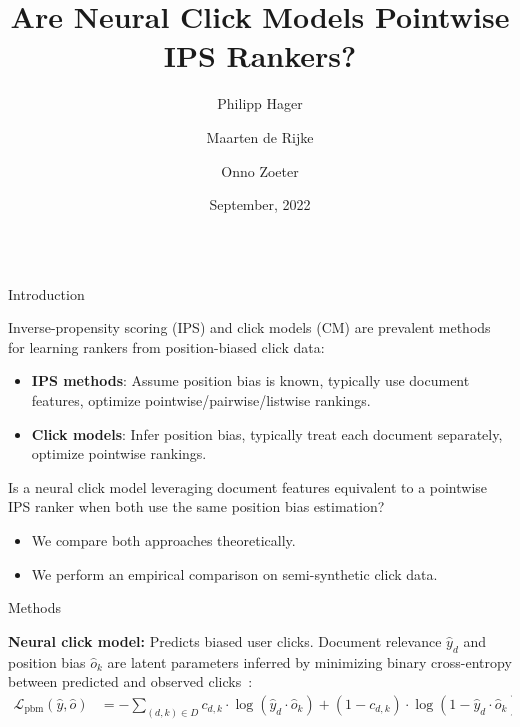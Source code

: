 \documentclass[final]{beamer}
\title{\huge Are Neural Click Models Pointwise IPS Rankers?}
\author{Philipp Hager\inst{1} \and Maarten de Rijke\inst{1} \and Onno Zoeter\inst{2}}
\institute[shortinst]{\inst{1} University of Amsterdam \inst{2} Booking.com}
\date[Sep. 2022]{September, 2022}
\newlength{\onecolwid}
\begin{document}
\begin{frame}[t]
	\begin{columns}[t]
    \begin{column}{\onecolwid}
    \begin{block}{Introduction}

		Inverse-propensity scoring (IPS) and click models (CM) are prevalent methods for learning rankers from position-biased click data:
		\vspace{1ex}
		\begin{itemize}
			\item {\bf IPS methods}: Assume position bias is known, typically use document features, optimize pointwise/pairwise/listwise rankings.
			\item {\bf Click models}: Infer position bias, typically treat each document separately, optimize pointwise rankings.
		\end{itemize}
		
		\vspace{1ex}
		
		Is a neural click model leveraging document features equivalent to a pointwise IPS ranker when both use the same position bias estimation?
		
		\vspace{1ex}
		
		\begin{itemize}
			\item We compare both approaches theoretically.
			\item We perform an empirical comparison on semi-synthetic click data.
		\end{itemize}

	\end{block}

	\vspace{1ex}

	\begin{block}{Methods}

		\textbf{Neural click model:} Predicts biased user clicks. Document relevance $\hat{y}_d$ and position bias $\hat{o}_k$ are latent parameters inferred by minimizing binary cross-entropy between predicted and observed clicks~\cite{Yan2022TwoTowers}:
		\vspace{1ex}
		\begin{equation*}
			\begin{split}
			\mathcal{L}_{\text{pbm}}(\hat{y}, \hat{o}) &= - \sum_{(d, k) \in D} c_{d,k} \cdot \log(\hat{y}_{d} \cdot \hat{o}_{k}) + (1 - c_{d,k}) \cdot \log(1 - \hat{y}_{d} \cdot \hat{o}_{k}).
			\end{split}
		\end{equation*}


\end{block}
\end{column}
\end{columns}
\end{frame}
\end{document}
